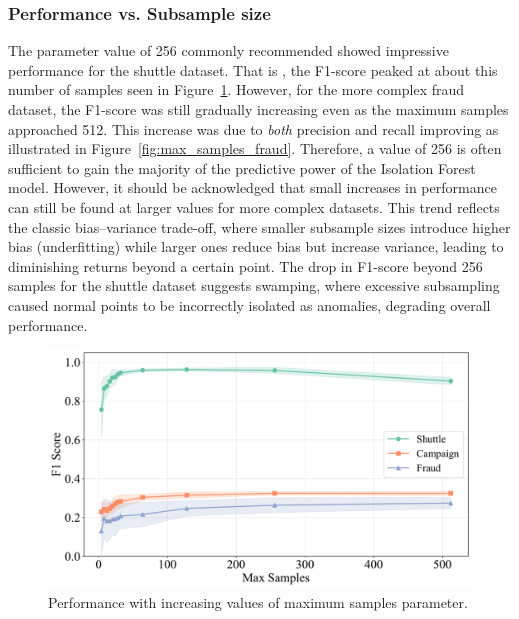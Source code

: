 \documentclass[10pt, conference]{IEEEtran}
\begin{document}
\subsubsection{Performance vs. Subsample size}
The parameter value of 256 commonly recommended \cite{iforest2} showed impressive performance for the shuttle dataset. That is , the F1-score peaked at about this number of samples seen in Figure~\ref{fig:max_samples_all}. However, for the more complex fraud dataset, the F1-score was still gradually increasing even as the maximum samples approached 512. This increase was due to \textit{both} precision and recall improving as illustrated in Figure~\ref{fig:max_samples_fraud}. Therefore, a value of 256 is often sufficient to gain the majority of the predictive power of the Isolation Forest model. However, it should be acknowledged that small increases in performance can still be found at larger values for more complex datasets. This trend reflects the classic bias–variance trade-off, where smaller subsample sizes introduce higher bias (underfitting) while larger ones reduce bias but increase variance, leading to diminishing returns beyond a certain point. The drop in F1-score beyond 256 samples for the shuttle dataset suggests swamping, where excessive subsampling caused normal points to be incorrectly isolated as anomalies, degrading overall performance.
\begin{figure}[H]
	\centering
	\includegraphics[width=0.95\linewidth]{../results/multi_dataset/max_samples_f1.pdf}
	\caption{Performance with increasing values of maximum samples parameter.}
	\label{fig:max_samples_all}
\end{figure}
\end{document}
